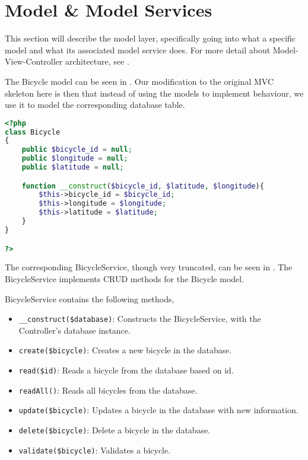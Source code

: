 \section{Model \& Model Services}
This section will describe the model layer, specifically going into what a specific model and what its associated model service does. For more detail about Model-View-Controller architecture, see .

The Bicycle model can be seen in . Our modification to the original MVC skeleton here is then that instead of using the models to implement behaviour, we use it to model the corresponding database table.

\begin{minipage}{\textwidth}
\begin{lstlisting}[language=php, label=lst:bicycleModel, caption={Bicycle Class}]
<?php
class Bicycle
{
    public $bicycle_id = null;
    public $longitude = null;
    public $latitude = null;

    function __construct($bicycle_id, $latitude, $longitude){
        $this->bicycle_id = $bicycle_id;
        $this->longitude = $longitude;
        $this->latitude = $latitude;
    }
}

?>
\end{lstlisting}
\end{minipage}

The corresponding BicycleService, though very truncated, can be seen in . The BicycleService implements CRUD methods for the Bicycle model.

BicycleService contains the following methods,

\begin{itemize}
\item \lstinline|__construct($database)|: Constructs the BicycleService, with the Controller's database instance.
\item \lstinline|create($bicycle)|: Creates a new bicycle in the database.
\item \lstinline|read($id)|: Reads a bicycle from the database based on id.
\item \lstinline|readAll()|: Reads all bicycles from the database.
\item \lstinline|update($bicycle)|: Updates a bicycle in the database with new information.
\item \lstinline|delete($bicycle)|: Delete a bicycle in the database.
\item \lstinline|validate($bicycle)|: Validates a bicycle.
\end{itemize}

